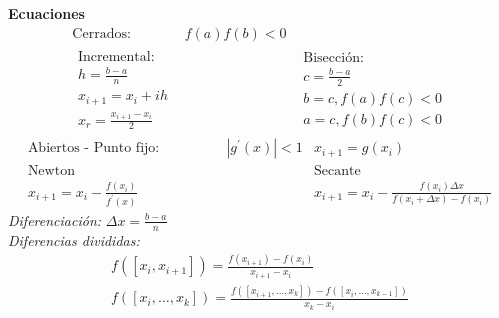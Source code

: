 \documentclass[12pt]{article}
\begin{document}
  \clearpage
  \textbf{Ecuaciones}
\begin{align*}
  \text{Cerrados: } & f(a)f(b)<0 &  \\
  \begin{array}{c}
  \text{Incremental:}\\
  h = \frac{b-a}{n} \\
  x_{i+1} = x_i + ih\\
  x_r = \frac{x_{i+1}-x_i}{2}
  \end{array}
  & \qquad \qquad &
  \begin{array}{c}
  \text{Bisección:}\\
  c = \frac{b-a}{2}\\
  b = c, f(a)f(c)<0\\
  a = c, f(b)f(c)<0
  \end{array}
\end{align*}
\begin{align*}
  \text{Abiertos - Punto fijo:}& \qquad \qquad |g^\prime (x)| < 1 & x_{i+1} = g(x_i) \\
  \text{Newton} & & \text{Secante} \\
  x_{i+1} = x_i - \frac{f(x_i)}{f^\prime(x)} & \qquad \qquad &
    x_{i+1} = x_i - \frac{f(x_i)\Delta x}{f(x_i+\Delta x)-f(x_i)}
\end{align*}
  \textit{Diferenciación:} $ \Delta x = \frac{b-a}{n}$\\
  \textit{Diferencias divididas:}
  \begin{eqnarray*}
  f([x_i, x_{i+1}]) = \frac{f(x_{i+1})-f(x_i)}{x_{i+1}-x_i}\\
  f([x_i, \ldots, x_k]) = \frac{f([x_{i+1}, \ldots, x_k]) - f([x_i, \ldots, x_{k-1}])}{x_k - x_i}
  \end{eqnarray*}
\end{document}
